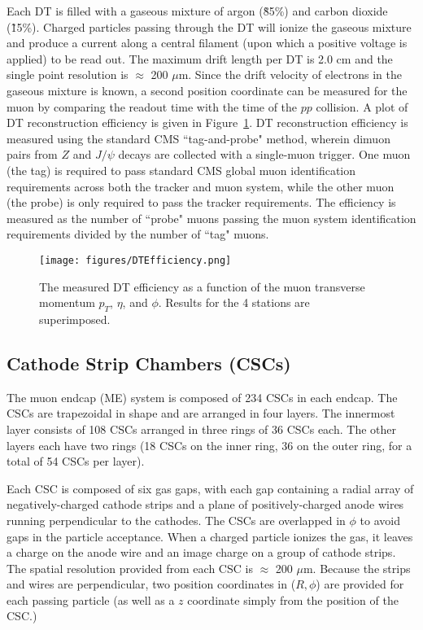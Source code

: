 Each DT is filled with a gaseous mixture of argon (\~85\%) and carbon dioxide (\~15\%). Charged particles passing through the DT will ionize the gaseous mixture and produce a current along a central filament (upon which a positive voltage is applied) to be read out. The maximum drift length per DT is 2.0 cm and the single point resolution is $\approx$ 200 $\mu$m. Since the drift velocity of electrons in the gaseous mixture is known, a second position coordinate can be measured for the muon by comparing the readout time with the time of the $pp$ collision. A plot of DT reconstruction efficiency is given in Figure~\ref{fig:DTEfficiency}\cite{TDR}. DT reconstruction efficiency is measured using the standard CMS ``tag-and-probe" method, wherein dimuon pairs from $Z$ and $J/\psi$ decays are collected with a single-muon trigger. One muon (the tag) is required to pass standard CMS global muon identification requirements across both the tracker and muon system, while the other muon (the probe) is only required to pass the tracker requirements. The efficiency is measured as the number of ``probe" muons passing the muon system identification requirements divided by the number of ``tag" muons\cite{Muon}.

\begin{figure}\centering
  \texttt{[image: figures/DTEfficiency.png]}
  \caption{\label{fig:DTEfficiency} The measured DT efficiency as a function of the muon transverse momentum $p_T$,
$\eta$, and $\phi$. Results for the 4 stations are superimposed.}
\end{figure}

\subsection{Cathode Strip Chambers (CSCs)}

The muon endcap (ME) system is composed of 234 CSCs in each endcap. The CSCs are trapezoidal in shape and are arranged in four layers. The innermost layer consists of 108 CSCs arranged in three rings of 36 CSCs each. The other layers each have two rings (18 CSCs on the inner ring, 36 on the outer ring, for a total of 54 CSCs per layer).\cite{Muon}

Each CSC is composed of six gas gaps, with each gap containing a radial array of negatively-charged cathode strips and a plane of positively-charged anode wires running perpendicular to the cathodes. The CSCs are overlapped in $\phi$ to avoid gaps in the particle acceptance. When a charged particle ionizes the gas, it leaves a charge on the anode wire and an image charge on a group of cathode strips. The spatial resolution provided from each CSC is $\approx$ 200 $\mu$m. Because the strips and wires are perpendicular, two position coordinates in ($R, \phi$) are provided for each passing particle (as well as a $z$ coordinate simply from the position of the CSC.)

